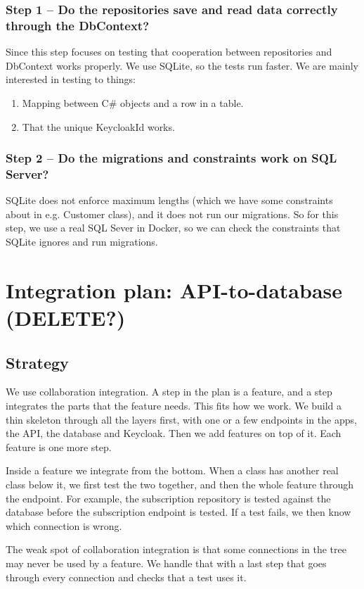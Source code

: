 \documentclass[a4paper,11pt]{article}
\begin{document}
\subsubsection*{Step 1 -- Do the repositories save and read data correctly through the DbContext?}
Since this step focuses on testing that cooperation between repositories and DbContext works properly.
We use SQLite, so the tests run faster.
We are mainly interested in testing to things:
\begin{enumerate}
  \item Mapping between C\# objects and a row in a table.
  \item That the unique KeycloakId works.
\end{enumerate}

\subsubsection*{Step 2 -- Do the migrations and constraints work on SQL Server?}
SQLite does not enforce maximum lengths (which we have some constraints about in e.g. Customer class), and it does not run our migrations.
So for this step, we use a real SQL Sever in Docker, so we can check the constraints that SQLite ignores and run migrations.

\section{Integration plan: API-to-database (DELETE?)}

\subsection{Strategy}
We use collaboration integration. A step in the plan is a feature, and a step integrates the parts that the feature needs. This fits how we work. We build a thin skeleton through all the layers first, with one or a few endpoints in the apps, the API, the database and Keycloak. Then we add features on top of it. Each feature is one more step.

Inside a feature we integrate from the bottom. When a class has another real class below it, we first test the two together, and then the whole feature through the endpoint. For example, the subscription repository is tested against the database before the subscription endpoint is tested. If a test fails, we then know which connection is wrong.

The weak spot of collaboration integration is that some connections in the tree may never be used by a feature. We handle that with a last step that goes through every connection and checks that a test uses it.
\end{document}
